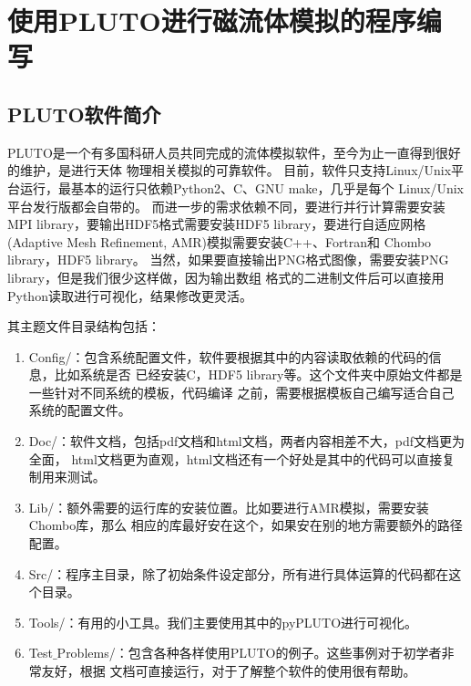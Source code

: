 \chapter{使用PLUTO进行磁流体模拟的程序编写}
\label{PLUTO}



\section{PLUTO软件简介}
\label{PLUTOintro}
PLUTO是一个有多国科研人员共同完成的流体模拟软件，至今为止一直得到很好的维护，是进行天体
物理相关模拟的可靠软件\citep{Mignone2007,Mignone2012}。
目前，软件只支持Linux/Unix平台运行，最基本的运行只依赖Python2、C、GNU make，几乎是每个
Linux/Unix平台发行版都会自带的。
而进一步的需求依赖不同，要进行并行计算需要安装MPI library，要输出HDF5格式需要安装HDF5
library，要进行自适应网格(Adaptive Mesh Refinement, AMR)模拟需要安装C++、Fortran和
Chombo library，HDF5 library。
当然，如果要直接输出PNG格式图像，需要安装PNG library，但是我们很少这样做，因为输出数组
格式的二进制文件后可以直接用Python读取进行可视化，结果修改更灵活。

其主题文件目录结构包括：

\begin{enumerate}

    \item Config/：包含系统配置文件，软件要根据其中的内容读取依赖的代码的信息，比如系统是否
    已经安装C，HDF5 library等。这个文件夹中原始文件都是一些针对不同系统的模板，代码编译
    之前，需要根据模板自己编写适合自己系统的配置文件。

    \item Doc/：软件文档，包括pdf文档和html文档，两者内容相差不大，pdf文档更为全面，
    html文档更为直观，html文档还有一个好处是其中的代码可以直接复制用来测试。

    \item Lib/：额外需要的运行库的安装位置。比如要进行AMR模拟，需要安装Chombo库，那么
    相应的库最好安在这个，如果安在别的地方需要额外的路径配置。

    \item Src/：程序主目录，除了初始条件设定部分，所有进行具体运算的代码都在这个目录。

    \item Tools/：有用的小工具。我们主要使用其中的pyPLUTO进行可视化。

    \item Test$\_$Problems/：包含各种各样使用PLUTO的例子。这些事例对于初学者非常友好，根据
    文档可直接运行，对于了解整个软件的使用很有帮助。

\end{enumerate}

